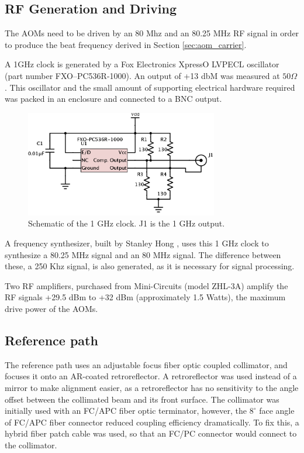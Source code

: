 \subsection{RF Generation and Driving}

The AOMs need to be driven by an 80 Mhz and an 80.25 MHz RF signal in order to produce the beat frequency derived in Section \ref{sec:aom_carrier}.

A 1GHz clock is generated by a Fox Electronics XpressO LVPECL oscillator (part number FXO–PC536R-1000). An output of +13 dbM was measured at $50\Omega$. This oscillator and the small amount of supporting electrical hardware required was packed in an enclosure and connected to a BNC output.

\begin{figure}[h!]
\centering
\includegraphics[width=0.75\textwidth]{Images/Schematics/1ghzclock_2.png}
\caption{Schematic of the 1 GHz clock. J1 is the 1 GHz output.}
\end{figure}

A frequency synthesizer, built by Stanley Hong \cite{hong}, uses this 1 GHz clock to synthesize a 80.25 MHz signal and an 80 MHz signal. The difference between these, a 250 Khz signal, is also generated, as it is necessary for signal processing.

Two RF amplifiers, purchased from Mini-Circuits (model ZHL-3A) amplify the RF signals +29.5 dBm to +32 dBm (approximately 1.5 Watts), the maximum drive power of the AOMs.

\subsection{Reference path}
\label{sec:reference_path}


The reference path uses an adjustable focus fiber optic coupled collimator, and focuses it onto an AR-coated retroreflector. A retroreflector was used instead of a mirror to make alignment easier, as a retroreflector has no sensitivity to the angle offset between the collimated beam and its front surface. The collimator was initially used with an FC/APC fiber optic terminator, however, the $8^{\circ}$ face angle of FC/APC fiber connector reduced coupling efficiency dramatically. To fix this, a hybrid fiber patch cable was used, so that an FC/PC connector would connect to the collimator.

